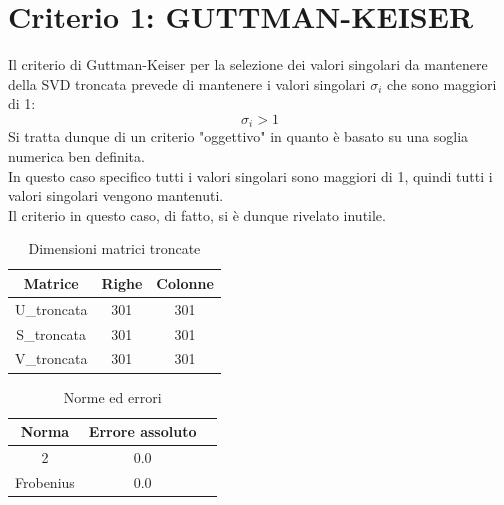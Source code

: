 \section{Criterio 1: GUTTMAN-KEISER}

Il criterio di Guttman-Keiser per la selezione dei valori singolari da mantenere della SVD troncata prevede di mantenere i valori singolari $\sigma_i$ che sono maggiori di 1:
\begin{equation}
    \sigma_i > 1
\end{equation}
Si tratta dunque di un criterio "oggettivo" in quanto è basato su una soglia numerica ben definita.\\
In questo caso specifico tutti i valori singolari sono maggiori di 1, quindi tutti i valori singolari vengono mantenuti.\\
Il criterio in questo caso, di fatto, si è dunque rivelato inutile.


\begin{table}[H]
    \centering
    \begin{tabular}{|c|c|c|}
        \hline
        \textbf{Matrice} & \textbf{Righe} & \textbf{Colonne} \\
        \hline
        U\_troncata & 301 & 301 \\
        \hline
        S\_troncata & 301 & 301 \\
        \hline
        V\_troncata & 301 & 301 \\
        \hline
    \end{tabular}
    \caption{Dimensioni matrici troncate}
\end{table}

\begin{table}[H]
    \centering
    \begin{tabular}{|c|c|c|}
        \hline
        \textbf{Norma} & \textbf{Errore assoluto} \\
        \hline
        2 & 0.0 \\
        \hline
        Frobenius & 0.0 \\
        \hline
    \end{tabular}
    \caption{Norme ed errori}
\end{table}

